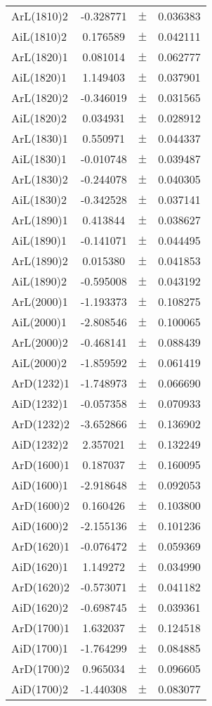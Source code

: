 \begin{table}
\begin{tiny}
\begin{tabular}{lccc}
ArL(1810)2 & -0.328771 & $\pm$ & 0.036383 \\
AiL(1810)2 & 0.176589 & $\pm$ & 0.042111 \\
ArL(1820)1 & 0.081014 & $\pm$ & 0.062777 \\
AiL(1820)1 & 1.149403 & $\pm$ & 0.037901 \\
ArL(1820)2 & -0.346019 & $\pm$ & 0.031565 \\
AiL(1820)2 & 0.034931 & $\pm$ & 0.028912 \\
ArL(1830)1 & 0.550971 & $\pm$ & 0.044337 \\
AiL(1830)1 & -0.010748 & $\pm$ & 0.039487 \\
ArL(1830)2 & -0.244078 & $\pm$ & 0.040305 \\
AiL(1830)2 & -0.342528 & $\pm$ & 0.037141 \\
ArL(1890)1 & 0.413844 & $\pm$ & 0.038627 \\
AiL(1890)1 & -0.141071 & $\pm$ & 0.044495 \\
ArL(1890)2 & 0.015380 & $\pm$ & 0.041853 \\
AiL(1890)2 & -0.595008 & $\pm$ & 0.043192 \\
ArL(2000)1 & -1.193373 & $\pm$ & 0.108275 \\
AiL(2000)1 & -2.808546 & $\pm$ & 0.100065 \\
ArL(2000)2 & -0.468141 & $\pm$ & 0.088439 \\
AiL(2000)2 & -1.859592 & $\pm$ & 0.061419 \\
ArD(1232)1 & -1.748973 & $\pm$ & 0.066690 \\
AiD(1232)1 & -0.057358 & $\pm$ & 0.070933 \\
ArD(1232)2 & -3.652866 & $\pm$ & 0.136902 \\
AiD(1232)2 & 2.357021 & $\pm$ & 0.132249 \\
ArD(1600)1 & 0.187037 & $\pm$ & 0.160095 \\
AiD(1600)1 & -2.918648 & $\pm$ & 0.092053 \\
ArD(1600)2 & 0.160426 & $\pm$ & 0.103800 \\
AiD(1600)2 & -2.155136 & $\pm$ & 0.101236 \\
ArD(1620)1 & -0.076472 & $\pm$ & 0.059369 \\
AiD(1620)1 & 1.149272 & $\pm$ & 0.034990 \\
ArD(1620)2 & -0.573071 & $\pm$ & 0.041182 \\
AiD(1620)2 & -0.698745 & $\pm$ & 0.039361 \\
ArD(1700)1 & 1.632037 & $\pm$ & 0.124518 \\
AiD(1700)1 & -1.764299 & $\pm$ & 0.084885 \\
ArD(1700)2 & 0.965034 & $\pm$ & 0.096605 \\
AiD(1700)2 & -1.440308 & $\pm$ & 0.083077 \\
\bottomrule
\end{tabular}
\end{tiny}
\end{table}

